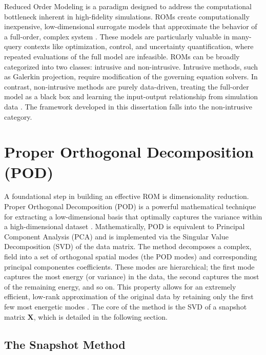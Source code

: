 \documentclass[tg, EN]{ufabcFHZh_tg}
\begin{document}
Reduced Order Modeling is a paradigm designed to address the computational bottleneck inherent in high-fidelity simulations. ROMs create computationally inexpensive, low-dimensional surrogate models that approximate the behavior of a full-order, complex system \citep{brunton2019, stabile2021}. These models are particularly valuable in many-query contexts like optimization, control, and uncertainty quantification, where repeated evaluations of the full model are infeasible. ROMs can be broadly categorized into two classes: intrusive and non-intrusive. Intrusive methods, such as Galerkin projection, require modification of the governing equation solvers. In contrast, non-intrusive methods are purely data-driven, treating the full-order model as a black box and learning the input-output relationship from simulation data \citep{hesthaven2016, benner2015}. The framework developed in this dissertation falls into the non-intrusive category.

\section{Proper Orthogonal Decomposition (POD)}

A foundational step in building an effective ROM is dimensionality reduction. Proper Orthogonal Decomposition (POD) is a powerful mathematical technique for extracting a low-dimensional basis that optimally captures the variance within a high-dimensional dataset \citep{berkooz1993, sirovich1987, holmes2012}. Mathematically, POD is equivalent to Principal Component Analysis (PCA) and is implemented via the Singular Value Decomposition (SVD) of the data matrix. The method decomposes a complex, field into a set of orthogonal spatial modes (the POD modes) and corresponding principal componentes coefficients. These modes are hierarchical; the first mode captures the most energy (or variance) in the data, the second captures the most of the remaining energy, and so on. This property allows for an extremely efficient, low-rank approximation of the original data by retaining only the first few most energetic modes \citep{rowley2017, taira2017}. The core of the method is the SVD of a snapshot matrix $\mathbf{X}$, which is detailed in the following section.

\subsection{The Snapshot Method}
\end{document}
